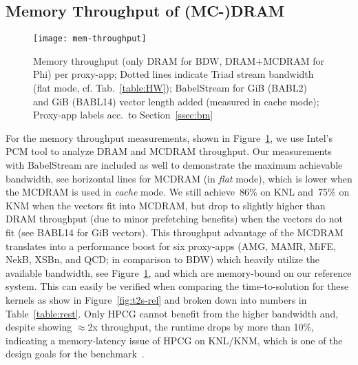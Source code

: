 
\subsection{Memory Throughput of (MC-)DRAM}\label{ssec:eval_mem}
%
\begin{figure}[tbp]
    \centering
    \texttt{[image: mem-throughput]}
    \caption{\label{fig:memthru} Memory throughput (only DRAM for BDW, DRAM+MCDRAM for Phi) per proxy-app; Dotted lines indicate Triad stream bandwidth (flat mode, cf. Tab.~\ref{table:HW}); BabelStream for \unit[2]{GiB} (BABL2) and \unit[14]{GiB} (BABL14) vector length added (measured in cache mode); Proxy-app labels acc.~to Section~\ref{ssec:bm}}
    \vspace{-0.2em}
\end{figure}
%
For the memory throughput measurements, shown in Figure~\ref{fig:memthru}, we use Intel's PCM tool to analyze DRAM and MCDRAM throughput.
Our measurements with BabelStream are included as well to demonstrate the maximum achievable bandwidth, see horizontal lines for MCDRAM
(in \textit{flat} mode), which is lower when the MCDRAM is used in \textit{cache} mode.
We still achieve~86\% on KNL and~75\% on KNM when the vectors fit into MCDRAM, but drop to slightly
higher than DRAM throughput (due to minor prefetching benefits) when the vectors do not fit (see BABL14 for \unit[14]{GiB} vectors).
This throughput advantage of the MCDRAM translates into a performance boost for six proxy-apps (AMG, MAMR, MiFE, NekB, XSBn, and QCD; in comparison to BDW)
which heavily utilize the available bandwidth, see Figure~\ref{fig:memthru}, and which are memory-bound on our reference system.
This can easily be verified when comparing the time-to-solution for these kernels as show in Figure~\ref{fig:t2s-rel} and broken down into numbers in Table~\ref{table:rest}.
Only HPCG cannot benefit from the higher bandwidth and, despite showing $\approx$2x throughput, the runtime drops by more than 10\%,
indicating a memory-latency issue of HPCG on KNL/KNM, which is one of the design goals for the benchmark~\cite{dongarra_new_2016}.

